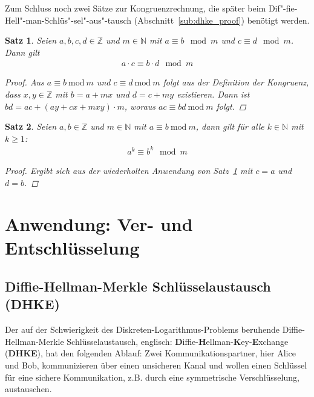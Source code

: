 \documentclass[
  a4paper,
  11pt,
]{scrartcl}
\theoremstyle{plain}
\newtheorem{satz}{Satz}
\theoremstyle{definition}
\theoremstyle{remark}
\newcommand{\N}{\mathbb{N}}
\newcommand{\Z}{\mathbb{Z}}
\newcommand{\Mod}[1]{\ \mathrm{mod}\ #1}
\begin{document}
Zum Schluss noch zwei Sätze zur Kongruenzrechnung, die später beim
Dif"-fie-Hell"-man-Schlüs"-sel"-aus"-tausch (Abschnitt~\ref{sub:dhke_proof})
benötigt werden.

\begin{satz}\label{satz:multiplikation_modulo}
  Seien $a,b,c,d \in \Z$ und $m \in \N$ mit $a \equiv b \mod m$ und $c \equiv d
  \mod m$. Dann gilt
  \begin{align*}
    a \cdot c \equiv b \cdot d \mod m
  \end{align*}
  \begin{proof}
    Aus $a \equiv b \Mod{m}$ und $c \equiv d \Mod{m}$ folgt aus der Definition
    der Kongruenz, dass $x, y \in \Z$ mit $b = a+mx$ und $d = c+my$ existieren.
    Dann ist $bd = ac + (ay + cx + mxy) \cdot m$, woraus $ac \equiv bd \Mod{m}$
    folgt.
  \end{proof}
\end{satz}

\begin{satz}\label{satz:potenzen_bei_kongruenzen}
  Seien $a, b \in \Z$ und $m \in \N$ mit $a \equiv b \Mod{m}$, dann gilt für
  alle $k \in \N$ mit $k \geq 1$:
  \begin{align*}
    a^k \equiv b^k \mod m
  \end{align*}
  \begin{proof}
    Ergibt sich aus der wiederholten Anwendung von
    Satz~\ref{satz:multiplikation_modulo} mit $c = a$ und $d = b$.
  \end{proof}
\end{satz}

\section{Anwendung: Ver- und Entschlüsselung}
\label{sec:anwendung_ver_und_entschlusselung}

\subsection{Diffie-Hellman-Merkle Schlüsselaustausch (DHKE)}
\label{sub:diffie_hellman_key_exchange}

Der auf der Schwierigkeit des Diskreten-Logarithmus-Problems beruhende
Diffie-Hellman-Merkle Schlüsselaustausch, englisch:
\textbf{D}iffie-\textbf{H}ellman-\textbf{K}ey-\textbf{E}xchange (\textbf{DHKE}),
hat den folgenden Ablauf:
Zwei Kommunikationspartner, hier Alice und Bob, kommunizieren über einen
unsicheren Kanal und wollen einen Schlüssel für eine sichere Kommunikation, z.B.
durch eine symmetrische Verschlüsselung, austauschen.
\end{document}

